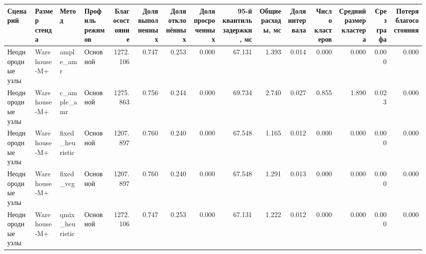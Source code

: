\begin{tabular}{llllrrrrrrrrrrr}
\toprule
 Сценарий & Размер стенда & Метод & Профиль режимов & Благосостояние & Доля выполненных & Доля отклонённых & Доля просроченных & 95-й квантиль задержки, мс & Общие расходы, мс & Доля интервала & Число кластеров & Средний размер кластера & Срез графа & Потеря благосостояния \\
\midrule
 Неоднородные узлы & Warehouse-M+ & ample_amr & Основной & 1272.106 & 0.747 & 0.253 & 0.000 & 67.131 & 1.393 & 0.014 & 0.000 & 0.000 & 0.000 & 0.000 \\
 Неоднородные узлы & Warehouse-M+ & c_ample_amr & Основной & 1275.863 & 0.756 & 0.244 & 0.000 & 69.734 & 2.740 & 0.027 & 0.855 & 1.890 & 0.023 & 0.000 \\
 Неоднородные узлы & Warehouse-M+ & fixed_heuristic & Основной & 1207.897 & 0.760 & 0.240 & 0.000 & 67.548 & 1.165 & 0.012 & 0.000 & 0.000 & 0.000 & 0.000 \\
 Неоднородные узлы & Warehouse-M+ & fixed_vcg & Основной & 1207.897 & 0.760 & 0.240 & 0.000 & 67.548 & 1.291 & 0.013 & 0.000 & 0.000 & 0.000 & 0.000 \\
 Неоднородные узлы & Warehouse-M+ & qmix_heuristic & Основной & 1272.106 & 0.747 & 0.253 & 0.000 & 67.131 & 1.222 & 0.012 & 0.000 & 0.000 & 0.000 & 0.000 \\
\bottomrule
\end{tabular}
